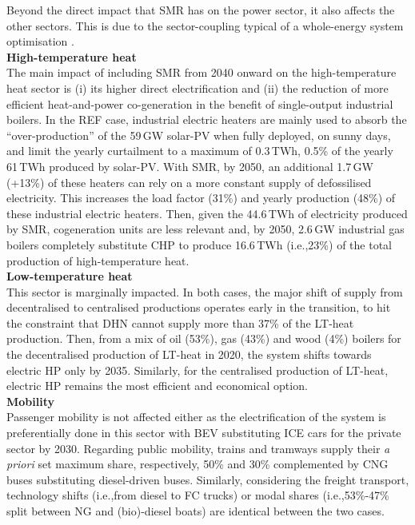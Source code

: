 \documentclass[11pt,twoside,a4paper,english]{article}
\def\ie{i.e.,}
\newcommand{\myparagraph}[1]{{\vspace{0cm}\textbf{#1}\vspace{-0.3cm}}}
\begin{document}
Beyond the direct impact that \gls{SMR} has on the power sector, it also affects the other sectors. This is due to the sector-coupling typical of a whole-energy system optimisation \cite{contino2020whole}.\\

\myparagraph{High-temperature heat}\\

The main impact of including \gls{SMR} from 2040 onward on the high-temperature heat sector is (i) its higher direct electrification and (ii) the reduction of more efficient heat-and-power co-generation in the benefit of single-output industrial boilers. In the REF case, industrial electric heaters are mainly used to absorb the ``over-production'' of the 59\,GW solar-PV when fully deployed, on sunny days, and limit the yearly curtailment to a maximum of 0.3\,TWh, 0.5\% of the yearly 61\,TWh produced by solar-PV. With \gls{SMR}, by 2050, an additional 1.7\,GW (+13\%) of these heaters can rely on a more constant supply of defossilised electricity. This increases the load factor (31\%) and yearly production (48\%) of these industrial electric heaters. Then, given the 44.6\,TWh of electricity produced by \gls{SMR}, cogeneration units are less relevant and, by 2050, 2.6\,GW industrial gas boilers completely substitute \gls{CHP} to produce 16.6\,TWh (\ie 23\%) of the total production of high-temperature heat.\\

\myparagraph{Low-temperature heat}\\

This sector is marginally impacted. In both cases, the major shift of supply from decentralised to centralised productions operates early in the transition, to hit the constraint that \gls{DHN} cannot supply more than 37\% of the \gls{LT}-heat production. Then, from a mix of oil (53\%), gas (43\%) and wood (4\%) boilers for the decentralised production of \gls{LT}-heat in 2020, the system shifts towards electric \gls{HP} only by 2035. Similarly, for the centralised production of \gls{LT}-heat, electric \gls{HP} remains the most efficient and economical option.\\

\myparagraph{Mobility}\\

Passenger mobility is not affected either as the electrification of the system is preferentially done in this sector with \gls{BEV} substituting \gls{ICE} cars for the private sector by 2030. Regarding public mobility, trains and tramways supply their \textit{a priori} set maximum share, respectively, 50\% and 30\% complemented by \gls{CNG} buses substituting diesel-driven buses. Similarly, considering the freight transport, technology shifts (\ie from diesel to \gls{FC} trucks) or modal shares (\ie 53\%-47\% split between \gls{NG} and (bio)-diesel boats) are identical between the two cases.\\
\end{document}
